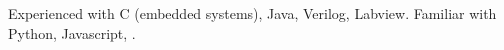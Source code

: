 \begin{cventries}
  \cventry
    {}
    {}
    {}
    {}
    {
      \begin{cvitems}
        \item {Experienced with C (embedded systems), Java, Verilog, Labview. Familiar with Python, Javascript, .}                           
      \end{cvitems}
    }
\end{cventries}
